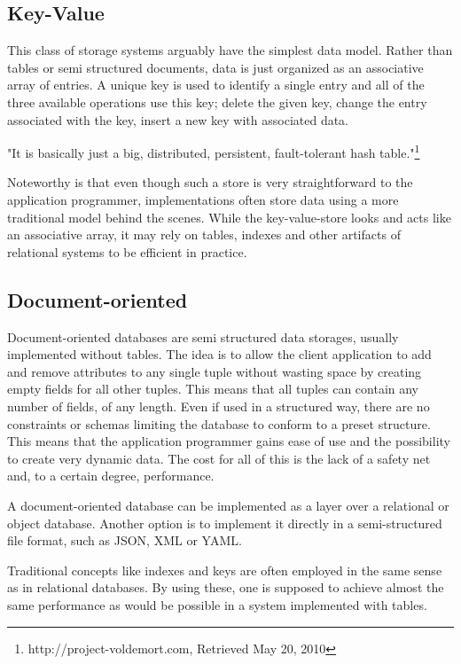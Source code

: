\subsection{Key-Value}

This class of storage systems arguably have the simplest data model. Rather than tables or semi structured documents, data is just organized as an associative array of entries. A unique key is used to identify a single entry and all of the three available operations use this key; delete the given key, change the entry associated with the key, insert a new key with associated data.

"It is basically just a big, distributed, persistent, fault-tolerant hash table."\footnote{http://project-voldemort.com, Retrieved May 20, 2010}

Noteworthy is that even though such a store is very straightforward to the application programmer, implementations often store data using a more traditional model behind the scenes. While the key-value-store looks and acts like an associative array, it may rely on tables, indexes and other artifacts of relational systems to be efficient in practice.

\subsection{Document-oriented}

Document-oriented databases are semi structured data storages, usually implemented without tables. The idea is to allow the client application to add and remove attributes to any single tuple without wasting space by creating empty fields for all other tuples. This means that all tuples can contain any number of fields, of any length. Even if used in a structured way, there are no constraints or schemas limiting the database to conform to a preset structure. This means that the application programmer gains ease of use and the possibility to create very dynamic data. The cost for all of this is the lack of a safety net and, to a certain degree, performance.

A document-oriented database can be implemented as a layer over a relational or object database. Another option is to implement it directly in a semi-structured file format, such as JSON, XML or YAML.

Traditional concepts like indexes and keys are often employed in the same sense as in relational databases. By using these, one is supposed to achieve almost the same performance as would be possible in a system implemented with tables.

